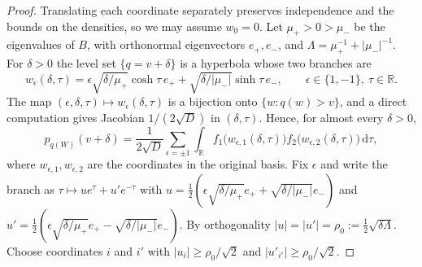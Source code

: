\documentclass[11pt]{amsart}
\numberwithin{equation}{section}
\theoremstyle{definition}
\theoremstyle{remark}
\newcommand{\R}{\mathbb R}
\newcommand{\1}{\mathbf 1}
\newcommand{\dd}{\,\mathrm d}
\newcommand{\abs}[1]{\lvert #1\rvert}
\begin{document}
\begin{proof}
Translating each coordinate separately preserves independence and the bounds on the densities, so we may assume $w_0=0$. Let $\mu_+>0>\mu_-$ be the eigenvalues of $B$, with orthonormal eigenvectors $e_+,e_-$, and $\Lambda=\mu_+^{-1}+\abs{\mu_-}^{-1}$. For $\delta>0$ the level set $\{q=v+\delta\}$ is a hyperbola whose two branches are
\[
w_\epsilon(\delta,\tau)=\epsilon\sqrt{\delta/\mu_+}\cosh\tau\,e_++\sqrt{\delta/\abs{\mu_-}}\sinh\tau\,e_-,\qquad\epsilon\in\{1,-1\},\ \tau\in\R .
\]
The map $(\epsilon,\delta,\tau)\mapsto w_\epsilon(\delta,\tau)$ is a bijection onto $\{w:q(w)>v\}$, and a direct computation gives Jacobian $1/(2\sqrt D)$ in $(\delta,\tau)$. Hence, for almost every $\delta>0$,
\[
p_{q(W)}(v+\delta)=\frac1{2\sqrt D}\sum_{\epsilon=\pm1}\int_\R f_1\bigl(w_{\epsilon,1}(\delta,\tau)\bigr)f_2\bigl(w_{\epsilon,2}(\delta,\tau)\bigr)\dd\tau,
\]
where $w_{\epsilon,1},w_{\epsilon,2}$ are the coordinates in the original basis. Fix $\epsilon$ and write the branch as $\tau\mapsto ue^\tau+u'e^{-\tau}$ with $u=\frac12(\epsilon\sqrt{\delta/\mu_+}e_++\sqrt{\delta/\abs{\mu_-}}e_-)$ and $u'=\frac12(\epsilon\sqrt{\delta/\mu_+}e_+-\sqrt{\delta/\abs{\mu_-}}e_-)$. By orthogonality $\abs u=\abs{u'}=\rho_0:=\frac12\sqrt{\delta\Lambda}$. Choose coordinates $i$ and $i'$ with $\abs{u_i}\ge\rho_0/\sqrt2$ and $\abs{u'_{i'}}\ge\rho_0/\sqrt2$.


\end{proof}
\end{document}
